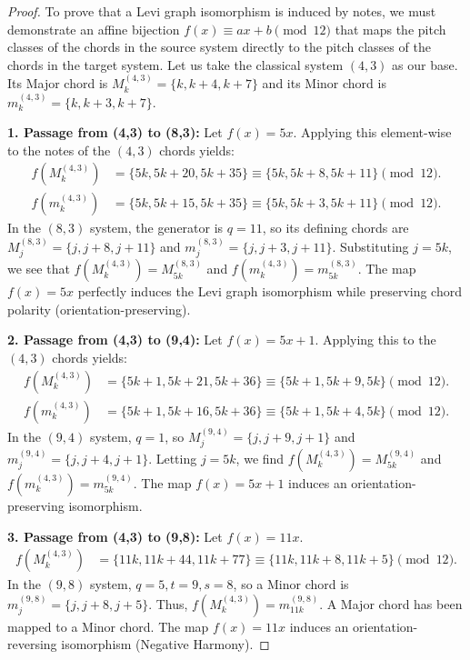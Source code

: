 \documentclass[11pt,letterpaper]{amsart}
\begin{document}
\begin{proof}
To prove that a Levi graph isomorphism is induced by notes, we must demonstrate an affine bijection $f(x) \equiv ax+b \pmod{12}$ that maps the pitch classes of the chords in the source system directly to the pitch classes of the chords in the target system. Let us take the classical system $(4,3)$ as our base. Its Major chord is $M_k^{(4,3)} = \{k, k+4, k+7\}$ and its Minor chord is $m_k^{(4,3)} = \{k, k+3, k+7\}$.

\textbf{1. Passage from (4,3) to (8,3):}
Let $f(x) = 5x$. Applying this element-wise to the notes of the $(4,3)$ chords yields:
\begin{align*}
    f(M_k^{(4,3)}) &= \{5k, 5k+20, 5k+35\} \equiv \{5k, 5k+8, 5k+11\} \pmod{12}. \\
    f(m_k^{(4,3)}) &= \{5k, 5k+15, 5k+35\} \equiv \{5k, 5k+3, 5k+11\} \pmod{12}.
\end{align*}
In the $(8,3)$ system, the generator is $q=11$, so its defining chords are $M_j^{(8,3)} = \{j, j+8, j+11\}$ and $m_j^{(8,3)} = \{j, j+3, j+11\}$. 
Substituting $j = 5k$, we see that $f(M_k^{(4,3)}) = M_{5k}^{(8,3)}$ and $f(m_k^{(4,3)}) = m_{5k}^{(8,3)}$. The map $f(x)=5x$ perfectly induces the Levi graph isomorphism while preserving chord polarity (orientation-preserving).

\textbf{2. Passage from (4,3) to (9,4):}
Let $f(x) = 5x+1$. Applying this to the $(4,3)$ chords yields:
\begin{align*}
    f(M_k^{(4,3)}) &= \{5k+1, 5k+21, 5k+36\} \equiv \{5k+1, 5k+9, 5k\} \pmod{12}. \\
    f(m_k^{(4,3)}) &= \{5k+1, 5k+16, 5k+36\} \equiv \{5k+1, 5k+4, 5k\} \pmod{12}.
\end{align*}
In the $(9,4)$ system, $q=1$, so $M_j^{(9,4)} = \{j, j+9, j+1\}$ and $m_j^{(9,4)} = \{j, j+4, j+1\}$. 
Letting $j = 5k$, we find $f(M_k^{(4,3)}) = M_{5k}^{(9,4)}$ and $f(m_k^{(4,3)}) = m_{5k}^{(9,4)}$. The map $f(x)=5x+1$ induces an orientation-preserving isomorphism.

\textbf{3. Passage from (4,3) to (9,8):}
Let $f(x) = 11x$. 
\begin{align*}
    f(M_k^{(4,3)}) &= \{11k, 11k+44, 11k+77\} \equiv \{11k, 11k+8, 11k+5\} \pmod{12}. 
\end{align*}
In the $(9,8)$ system, $q=5, t=9, s=8$, so a Minor chord is $m_j^{(9,8)} = \{j, j+8, j+5\}$. 
Thus, $f(M_k^{(4,3)}) = m_{11k}^{(9,8)}$. A Major chord has been mapped to a Minor chord. The map $f(x)=11x$ induces an orientation-reversing isomorphism (Negative Harmony).


\end{proof}
\end{document}
